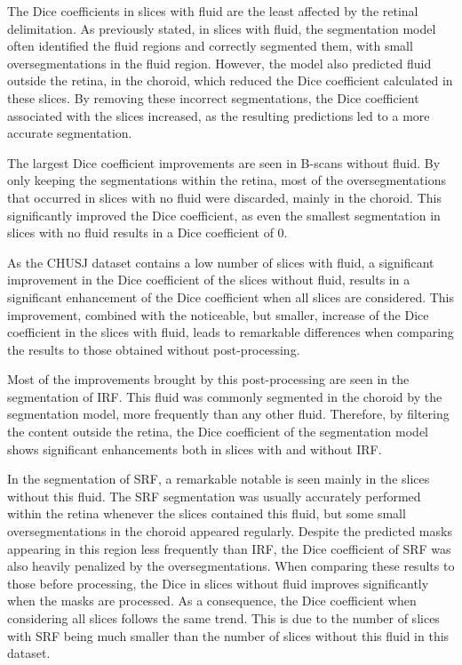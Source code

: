 The Dice coefficients in slices with fluid are the least affected by the retinal delimitation. As previously stated, in slices with fluid, the segmentation model often identified the fluid regions and correctly segmented them, with small oversegmentations in the fluid region. However, the model also predicted fluid outside the retina, in the choroid, which reduced the Dice coefficient calculated in these slices. By removing these incorrect segmentations, the Dice coefficient associated with the slices increased, as the resulting predictions led to a more accurate segmentation.
\par
The largest Dice coefficient improvements are seen in B-scans without fluid. By only keeping the segmentations within the retina, most of the oversegmentations that occurred in slices with no fluid were discarded, mainly in the choroid. This significantly improved the Dice coefficient, as even the smallest segmentation in slices with no fluid results in a Dice coefficient of 0.
\par
As the CHUSJ dataset contains a low number of slices with fluid, a significant improvement in the Dice coefficient of the slices without fluid, results in a significant enhancement of the Dice coefficient when all slices are considered. This improvement, combined with the noticeable, but smaller, increase of the Dice coefficient in the slices with fluid, leads to remarkable differences when comparing the results to those obtained without post-processing.
\par
Most of the improvements brought by this post-processing are seen in the segmentation of IRF. This fluid was commonly segmented in the choroid by the segmentation model, more frequently than any other fluid. Therefore, by filtering the content outside the retina, the Dice coefficient of the segmentation model shows significant enhancements both in slices with and without IRF. 
\par
In the segmentation of SRF, a remarkable notable is seen mainly in the slices without this fluid. The SRF segmentation was usually accurately performed within the retina whenever the slices contained this fluid, but some small oversegmentations in the choroid appeared regularly. Despite the predicted masks appearing in this region less frequently than IRF, the Dice coefficient of SRF was also heavily penalized by the oversegmentations. When comparing these results to those before processing, the Dice in slices without fluid improves significantly when the masks are processed. As a consequence, the Dice coefficient when considering all slices follows the same trend. This is due to the number of slices with SRF being much smaller than the number of slices without this fluid in this dataset.
